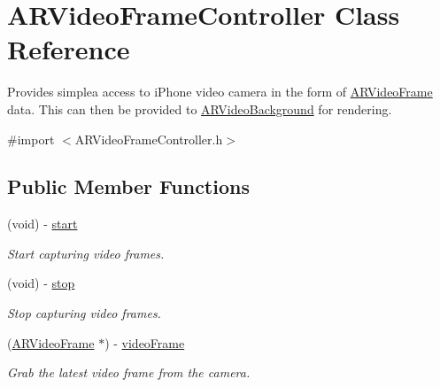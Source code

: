 \hypertarget{interface_a_r_video_frame_controller}{
\section{\-A\-R\-Video\-Frame\-Controller \-Class \-Reference}
\label{interface_a_r_video_frame_controller}
}


\-Provides simplea access to i\-Phone video camera in the form of \hyperlink{struct_a_r_video_frame}{\-A\-R\-Video\-Frame} data. \-This can then be provided to \hyperlink{interface_a_r_video_background}{\-A\-R\-Video\-Background} for rendering.  




{\ttfamily \#import $<$\-A\-R\-Video\-Frame\-Controller.\-h$>$}

\subsection*{\-Public \-Member \-Functions}
\begin{DoxyCompactItemize}
\item 
\hypertarget{interface_a_r_video_frame_controller_a6ee104be0e287fea2f8beed4f4e97cf6}{
(void) -\/ \hyperlink{interface_a_r_video_frame_controller_a6ee104be0e287fea2f8beed4f4e97cf6}{start}}
\label{interface_a_r_video_frame_controller_a6ee104be0e287fea2f8beed4f4e97cf6}

\begin{DoxyCompactList}\small\item\em \-Start capturing video frames. \end{DoxyCompactList}\item 
\hypertarget{interface_a_r_video_frame_controller_a509702d9d3e1fa9932bb304ea3f509fb}{
(void) -\/ \hyperlink{interface_a_r_video_frame_controller_a509702d9d3e1fa9932bb304ea3f509fb}{stop}}
\label{interface_a_r_video_frame_controller_a509702d9d3e1fa9932bb304ea3f509fb}

\begin{DoxyCompactList}\small\item\em \-Stop capturing video frames. \end{DoxyCompactList}\item 
(\hyperlink{struct_a_r_video_frame}{\-A\-R\-Video\-Frame} $\ast$) -\/ \hyperlink{interface_a_r_video_frame_controller_acc064912b45b3e81fcbc8b21d2953e29}{video\-Frame}
\begin{DoxyCompactList}\small\item\em \-Grab the latest video frame from the camera. \end{DoxyCompactList}\end{DoxyCompactItemize}


